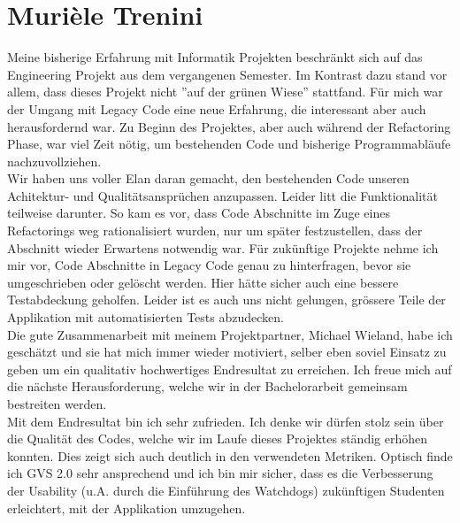 \documentclass[11pt,a4paper,english,oneside]{book}
\numberwithin{equation}{chapter}
\begin{document}
	\section{Murièle Trenini}
	
	Meine bisherige Erfahrung mit Informatik Projekten beschränkt sich auf das Engineering Projekt aus dem vergangenen Semester. Im Kontrast dazu stand vor allem, dass dieses Projekt nicht ''auf der grünen Wiese'' stattfand. Für mich war der Umgang mit Legacy Code eine neue Erfahrung, die interessant aber auch herausfordernd war. Zu Beginn des Projektes, aber auch während der Refactoring Phase, war viel Zeit nötig, um bestehenden Code und bisherige Programmabläufe nachzuvollziehen.  \\

	\noindent	
	Wir haben uns voller Elan daran gemacht, den bestehenden Code unseren Achitektur- und Qualitätsansprüchen anzupassen. Leider litt die Funktionalität teilweise darunter. So kam es vor, dass Code Abschnitte im Zuge eines Refactorings weg rationalisiert wurden, nur um später festzustellen, dass der Abschnitt wieder Erwartens notwendig war. Für zukünftige Projekte nehme ich mir vor, Code Abschnitte in Legacy Code genau zu hinterfragen, bevor sie umgeschrieben oder gelöscht werden. Hier hätte sicher auch eine bessere Testabdeckung geholfen. Leider ist es auch uns nicht gelungen, grössere Teile der Applikation mit automatisierten Tests abzudecken. \\

	\noindent	
	Die gute Zusammenarbeit mit meinem Projektpartner, Michael Wieland, habe ich geschätzt und sie hat mich immer wieder motiviert, selber eben soviel Einsatz zu geben um ein qualitativ hochwertiges Endresultat zu erreichen. Ich freue mich auf die nächste Herausforderung, welche wir in der Bachelorarbeit gemeinsam bestreiten werden.\\
	
	\noindent
	Mit dem Endresultat bin ich sehr zufrieden.  Ich denke wir dürfen stolz sein über die Qualität des Codes, welche wir im Laufe dieses Projektes ständig erhöhen konnten. Dies zeigt sich auch deutlich in den verwendeten Metriken. Optisch finde ich GVS 2.0 sehr ansprechend und ich bin mir sicher, dass es die Verbesserung der Usability (u.A. durch die Einführung des Watchdogs) zukünftigen Studenten erleichtert, mit der Applikation umzugehen.
	
	\clearpage
\end{document}
